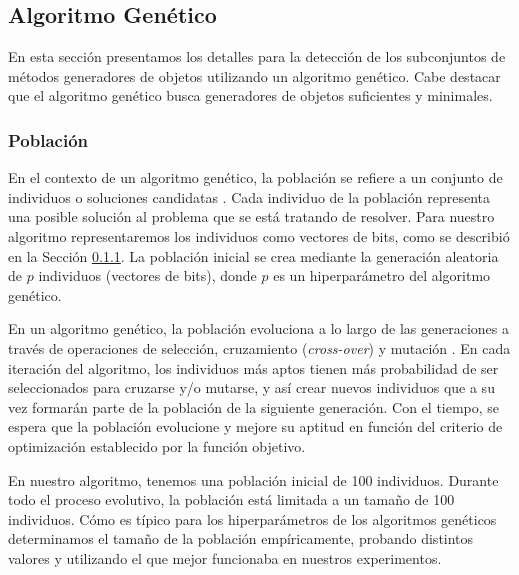 \subsection{Algoritmo Genético}
\label{alg:approachGA}

En esta sección presentamos los detalles para la detección de los subconjuntos de métodos generadores de objetos utilizando un algoritmo genético. Cabe destacar que el algoritmo genético busca generadores de objetos suficientes y minimales.

\subsubsection{Población}

En el contexto de un algoritmo genético, la población se refiere a un conjunto de individuos o soluciones candidatas \cite{}. Cada individuo de la población representa una posible solución al problema que se está tratando de resolver. Para nuestro algoritmo representaremos los individuos como vectores de bits, como se describió en la Sección \ref{}. La población inicial se crea mediante  la generación aleatoria de $p$ individuos (vectores de bits), donde $p$ es un hiperparámetro del algoritmo genético.

En un algoritmo genético, la población evoluciona a lo largo de las generaciones a través de operaciones de selección, cruzamiento (\emph{cross-over}) y mutación \cite{}. En cada iteración del algoritmo, los individuos más aptos tienen más probabilidad de ser seleccionados para cruzarse y/o mutarse, y así crear nuevos individuos que a su vez formarán parte de la población de la siguiente generación. Con el tiempo, se espera que la población evolucione y mejore su aptitud en función del criterio de optimización establecido por la función objetivo.

En nuestro algoritmo, tenemos una población inicial de 100 individuos. Durante todo el proceso evolutivo, la población está limitada a un tamaño de 100 individuos. Cómo es típico para los hiperparámetros de los algoritmos genéticos determinamos el tamaño de la población empíricamente, probando distintos valores y utilizando el que mejor funcionaba en nuestros experimentos. 

